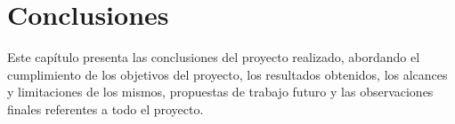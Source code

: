 \newpage
\chapter{Conclusiones}
Este capítulo presenta las conclusiones del proyecto realizado, abordando el cumplimiento de los objetivos del proyecto, los resultados obtenidos, los alcances y limitaciones de los mismos, propuestas de trabajo futuro y las observaciones finales referentes a todo el proyecto.
